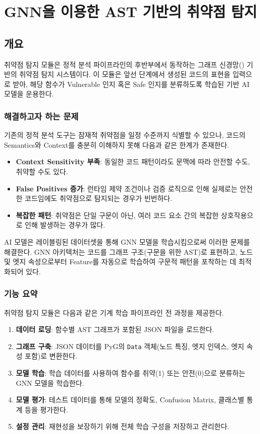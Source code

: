 \clearpage

\section{GNN을 이용한 AST 기반의 취약점 탐지}

\subsection{개요}
취약점 탐지 모듈은 정적 분석 파이프라인의 후반부에서 동작하는 그래프 신경망(\abbrGNN) 기반의 취약점 탐지 시스템이다. 이 모듈은 앞선 단계에서 생성된 코드의 \abbrAST 표현을 입력으로 받아, 해당 함수가 Vulnerable 인지 혹은 Safe 인지를 분류하도록 학습된 \abbrPyG 기반 AI 모델을 운용한다.

\subsubsection{해결하고자 하는 문제}
기존의 정적 분석 도구는 잠재적 취약점을 일정 수준까지 식별할 수 있으나, 코드의 Semantics와 Context를 충분히 이해하지 못해 다음과 같은 한계가 존재한다.

\begin{itemize}
    \item \textbf{Context Sensitivity 부족}: 동일한 코드 패턴이라도 문맥에 따라 안전할 수도, 취약할 수도 있다.
    \item \textbf{False Positives 증가}: 런타임 제약 조건이나 검증 로직으로 인해 실제로는 안전한 코드임에도 취약점으로 탐지되는 경우가 빈번하다.
    \item \textbf{복잡한 패턴}: 취약점은 단일 구문이 아닌, 여러 코드 요소 간의 복잡한 상호작용으로 인해 발생하는 경우가 많다.
\end{itemize}

AI 모델은 레이블링된 데이터셋을 통해 GNN 모델을 학습시킴으로써 이러한 문제를 해결한다. GNN 아키텍처는 코드를 그래프 구조(구문을 위한 AST)로 표현하고, 노드 및 엣지 속성으로부터 Feature를 자동으로 학습하여 구문적 패턴을 포착하는 데 최적화되어 있다.

\subsubsection{기능 요약}
취약점 탐지 모듈은 다음과 같은 기계 학습 파이프라인 전 과정을 제공한다.

\begin{enumerate}
    \item \textbf{데이터 로딩}: 함수별 AST 그래프가 포함된 JSON 파일을 로드한다.
    \item \textbf{그래프 구축}: JSON 데이터를 PyG의 \texttt{Data} 객체(노드 특징, 엣지 인덱스, 엣지 속성 포함)로 변환한다.
    \item \textbf{모델 학습}: 학습 데이터를 사용하여 함수를 취약(1) 또는 안전(0)으로 분류하는 GNN 모델을 학습한다.
    \item \textbf{모델 평가}: 테스트 데이터를 통해 모델의 정확도, Confusion Matrix, 클래스별 통계 등을 평가한다.
    \item \textbf{설정 관리}: 재현성을 보장하기 위해 전체 학습 구성을 저장하고 관리한다.
\end{enumerate}

